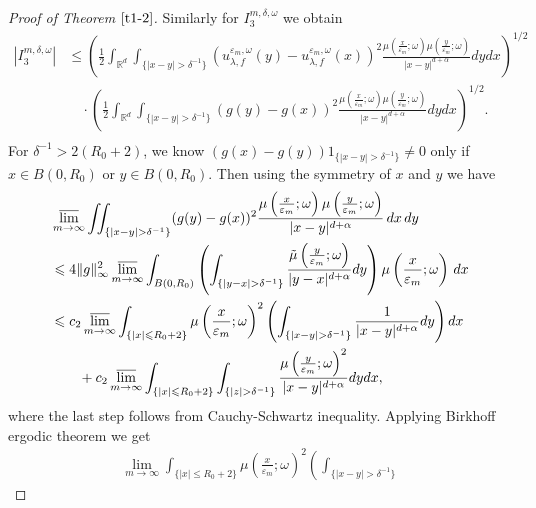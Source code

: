 \documentclass[11pt,draft, reqno]{amsart}
\renewcommand{\leq}{\leqslant}
\renewcommand{\le}{\leqslant}
\def\EE{{\mathcal E}}
\newcommand{\R}{\mathds R}
\newcommand{\e}{\varepsilon}
\newcommand{\w}{\omega}
\theoremstyle{definition}
\numberwithin{equation}{section}
\begin{document}
\begin{proof} [Proof of Theorem $\ref{t1-2}$]
Similarly for $I_3^{m,\delta,\w}$ we obtain
\begin{align*}
|I_3^{m,\delta,\w}|&\le \left(\frac{1}{2}\int_{\R^d}\int_{\{|x-y|> \delta^{-1}\}}
\left(u_{\lambda,f}^{\e_m,\w}(y)-u_{\lambda,f}^{\e_m,\w}(x)\right)^2\frac{\mu\left(\frac{x}{\e_m};\w\right)\mu\left(\frac{y}{\e_m};\w\right)}{|x-y|^{d+\alpha}}dydx\right)^{1/2}\\
&\quad \cdot \left(\frac{1}{2}\int_{\R^d}\int_{\{|x-y|> \delta^{-1}\}}
\left(g(y)-g(x)\right)^2\frac{\mu\left(\frac{x}{\e_m};\w\right)\mu\left(\frac{y}{\e_m};\w\right)}{|x-y|^{d+\alpha}}dydx\right)^{1/2}.\\
\end{align*}
For $\delta^{-1}>2(R_0+2)$, we know $\left(g(x)-g(y)\right)1_{\{|x-y|>\delta^{-1}\}}\neq 0$ only if
$x\in B(0,R_0)$ or $y\in B(0,R_0)$. Then using the symmetry of $x$ and $y$ we have
\begin{align*}
&\varlimsup_{m\to \infty} \iint_{\{|x-y|>\delta^{-1}\}}(g(y)- g(x))^2\frac{\mu\left(\frac{x}{\e_m};\w\right)\mu\left(\frac{y}{\e_m};\w\right)}{|x-y|^{d+\alpha}}\,dx\,dy
\\
& \leq  4\|g\|_\infty^2\varlimsup_{m \to \infty}  \int_{B(0, R_0)} \left( \int_{\{|y-x|>\delta^{-1}\}} \frac{\tilde \mu\left(\frac{y}{\e_m};\w\right)}
{|y-x|^{d+\alpha}} dy \right)
 \mu\left(\frac{x}{\e_m};\w\right) \,dx \\
&\le c_2\varlimsup_{m \to \infty}\int_{\{|x|\le R_0+2\}}\mu\left(\frac{x}{\e_m};\w\right)^2\left(\int_{\{|x-y|> \delta^{-1}\}}
\frac{1}{|x-y|^{d+\alpha}}dy\right)dx\\
&\quad\quad +c_2\varlimsup_{m \to \infty}\int_{\{|x|\le R_0+2\}}\int_{\{|z|> \delta^{-1}\}}\frac{\mu\left(\frac{y}{\e_m};\w\right)^2}{|x-y|^{d+\alpha}}dydx,
\end{align*}
where the last step follows from Cauchy-Schwartz inequality.
Applying Birkhoff ergodic theorem  we get
\begin{align*}
\lim_{m \to \infty}\int_{\{|x|\le R_0+2\}}\mu\left(\frac{x}{\e_m};\w\right)^2\left(\int_{\{|x-y|> \delta^{-1}\}}

\end{align*}
\end{proof}
\end{document}
